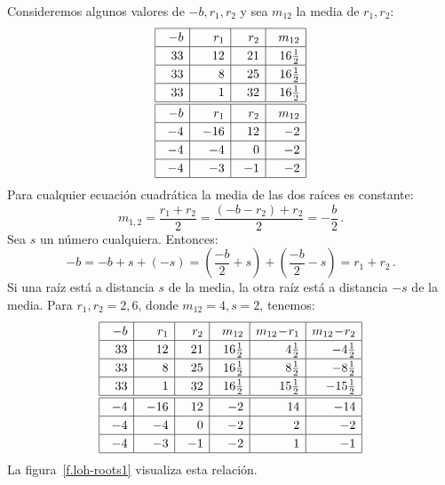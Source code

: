 \noindent{}Consideremos algunos valores de $-b,r_1,r_2$ y sea $m_{12}$ la media de $r_1,r_2$:
\[
\renewcommand{\arraystretch}{1.2}
\begin{array}{|@{\hspace{1em}}r|@{\hspace{1em}}r|@{\hspace{1em}}r|@{\hspace{1em}}r|}
\hline
-b& r_1 & r_2 &m_{12}\\\hline
33 & 12 & 21 & 16\frac{1}{2}\\\hline
33 & 8 & 25 & 16\frac{1}{2}\\\hline
33 & 1 & 32 & 16\frac{1}{2}\\\hline\hline
-b& r_1 & r_2 &m_{12}\\\hline
-4 & -16 & 12 & -2 \\\hline
-4 & -4 & 0 & -2 \\\hline
-4 & -3 & -1 & -2 \\\hline
\end{array}
\]
Para cualquier ecuación cuadrática la media de las dos raíces es constante:
\[
m_{1,2}=\frac{r_1+r_2}{2}=
\frac{(-b-r_2)+r_2}{2}=
-\frac{b}{2}\,.
\]
Sea $s$ un número cualquiera. Entonces:
\[
-b=-b+s+(-s)=\left(\frac{-b}{2}+s\right) + \left(\frac{-b}{2}-s\right)=r_1+r_2\,.
\]
Si una raíz está a distancia $s$ de la media, la otra raíz está a distancia $-s$ de la media. Para $r_1,r_2=2,6$, donde $m_{12}=4, s=2$, tenemos:
\[
\renewcommand{\arraystretch}{1.2}
\begin{array}{|@{\hspace{1em}}r|@{\hspace{1em}}r|@{\hspace{1em}}r|@{\hspace{1em}}r|r|r|}
\hline
-b& r_1 & r_2 & m_{12}& m_{12}\!-\!r_1 & m_{12}\!-\!r_2\\\hline
33 & 12 & 21 & 16\frac{1}{2}&4\frac{1}{2} & -4\frac{1}{2}  \\\hline
33 & 8 & 25 & 16\frac{1}{2}&8\frac{1}{2}&-8\frac{1}{2}\\\hline
33 & 1 & 32 & 16\frac{1}{2}&15\frac{1}{2}&-15\frac{1}{2}\\\hline
\hline
-4 & -16 & 12 & -2 &14& -14\\\hline
-4 & -4 & 0 & -2&2&-2 \\\hline
-4 & -3 & -1 & -2&1&-1 \\\hline
\end{array}
\]
La figura~\ref{f.loh-roots1} visualiza esta relación.
